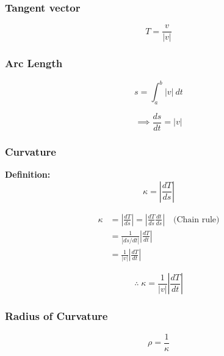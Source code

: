 \documentclass[12pt]{article}
\theoremstyle{definition}
\begin{document}
\subsubsection{Tangent vector}

\begin{equation*}
	T = \frac{v}{ \left| v \right| }
\end{equation*}

\subsubsection{Arc Length}

\begin{equation*}
	s = \int_{a}^{b} \left| v \right| \: dt 
\end{equation*}

\begin{equation*}
	\implies \frac{ds}{dt} = \left| v \right|
\end{equation*}

\subsubsection{Curvature}

\textbf{Definition:} 
\begin{equation*}
	\kappa = \left| \frac{dT}{ds} \right|
\end{equation*}

\begin{align*}
	\kappa &=  \left| \frac{dT}{ds} \right| = \left| \frac{dT}{ds} \frac{dt}{ds} \right|\quad \textrm{(Chain rule)} \\
	&=  \frac{1}{ \left| ds/dt \right| } \left| \frac{dT}{dt} \right| \\
	&=  \frac{1}{ \left| v \right| } \left| \frac{dT}{dt} \right|
\end{align*}

\begin{equation*}
	\therefore\; \kappa = \frac{1}{ \left| v \right| } \left| \frac{dT}{dt} \right|
\end{equation*}

\subsubsection{Radius of Curvature}

\begin{equation*}
	\rho = \frac{1}{\kappa}
\end{equation*}
\end{document}
